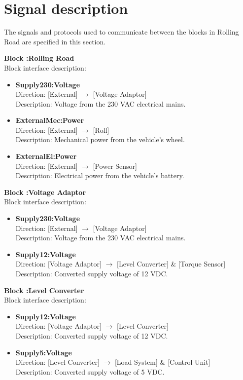 \section{Signal description}
The signals and protocols used to communicate between the blocks in Rolling Road are specified in this section.

\textbf{Block :Rolling Road}\\
Block interface description:
\begin{itemize}
	\item \textbf{Supply230:Voltage}\\
	Direction: [External] $\rightarrow$ [Voltage Adaptor]\\
	Description: Voltage from the 230 VAC electrical mains.
	\item \textbf{ExternalMec:Power}\\
	Direction: [External] $\rightarrow$ [Roll]\\
	Description: Mechanical power from the vehicle's wheel.
	\item \textbf{ExternalEl:Power}\\
	Direction: [External] $\rightarrow$ [Power Sensor]\\
	Description: Electrical power from the vehicle's battery.
\end{itemize}
	
\textbf{Block :Voltage Adaptor}\\
Block interface description:
\begin{itemize}
	\item \textbf{Supply230:Voltage}\\
	Direction: [External] $\rightarrow$ [Voltage Adaptor]\\
	Description: Voltage from the 230 VAC electrical mains.
	\item \textbf{Supply12:Voltage}\\
	Direction: [Voltage Adaptor] $\rightarrow$ [Level Converter] \& [Torque Sensor]\\
	Description: Converted supply voltage of 12 VDC.
\end{itemize}
		
\textbf{Block :Level Converter}\\
Block interface description:
\begin{itemize}
	\item \textbf{Supply12:Voltage}\\
	Direction: [Voltage Adaptor] $\rightarrow$ [Level Converter]\\
	Description: Converted supply voltage of 12 VDC.
	\item \textbf{Supply5:Voltage}\\
	Direction: [Level Converter] $\rightarrow$ [Load System] \& [Control Unit]\\
	Description: Converted supply voltage of 5 VDC.
\end{itemize}
			
